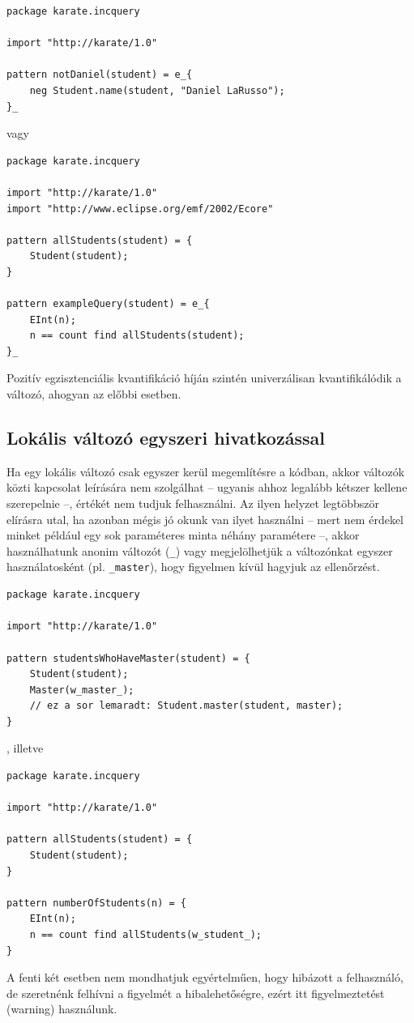 \begin{lstlisting}
package karate.incquery

import "http://karate/1.0"

pattern notDaniel(student) = e_{
    neg Student.name(student, "Daniel LaRusso");
}_
\end{lstlisting}
%
%
vagy
%
\begin{lstlisting}
package karate.incquery

import "http://karate/1.0"
import "http://www.eclipse.org/emf/2002/Ecore"

pattern allStudents(student) = {
    Student(student);
}

pattern exampleQuery(student) = e_{
    EInt(n);
    n == count find allStudents(student);
}_
\end{lstlisting}
%
%
Pozitív egzisztenciális kvantifikáció híján szintén univerzálisan kvantifikálódik a változó, ahogyan az előbbi esetben.

\subsection{Lokális változó egyszeri hivatkozással}

Ha egy lokális változó csak egyszer kerül megemlítésre a kódban, akkor változók közti kapcsolat leírására nem szolgálhat -- ugyanis ahhoz legalább kétszer kellene szerepelnie --, értékét nem tudjuk felhasználni. Az ilyen helyzet legtöbbször elírásra utal, ha azonban mégis jó okunk van ilyet használni -- mert nem érdekel minket például egy sok paraméteres minta néhány paramétere --, akkor használhatunk anonim változót (\texttt{\_}) vagy megjelölhetjük a változónkat egyszer használatosként (pl. \texttt{\_master}), hogy figyelmen kívül hagyjuk az ellenőrzést.

\begin{lstlisting}
package karate.incquery

import "http://karate/1.0"

pattern studentsWhoHaveMaster(student) = {
    Student(student);
    Master(w_master_);
    // ez a sor lemaradt: Student.master(student, master);
}
\end{lstlisting}
%
%
, illetve
%
\begin{lstlisting}
package karate.incquery

import "http://karate/1.0"

pattern allStudents(student) = {
    Student(student);
}

pattern numberOfStudents(n) = {
    EInt(n);
    n == count find allStudents(w_student_);
}
\end{lstlisting}
%
%
A fenti két esetben nem mondhatjuk egyértelműen, hogy hibázott a felhasználó, de szeretnénk felhívni a figyelmét a hibalehetőségre, ezért itt figyelmeztetést (warning) használunk.

